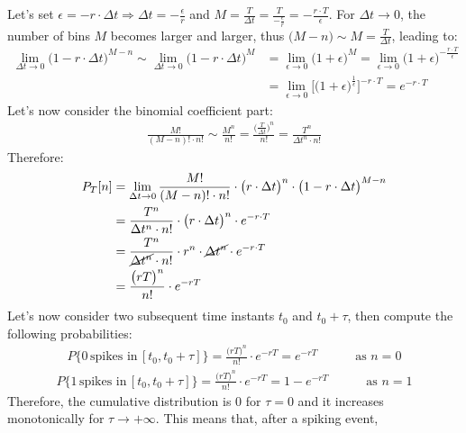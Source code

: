 Let's set \(\epsilon=-r\cdot{\Delta{t}}\Rightarrow \Delta{t}=-\frac{\epsilon}{r}\)
and \(M=\frac{T}{\Delta{t}}=\frac{T}{-\frac{\epsilon}{r}}=-\frac{r\cdot{T}}{\epsilon}\).
For \(\Delta{t}\to{0}\), the number of bins \(M\) becomes larger and larger,
thus \(\bigl(M-n\bigr)\sim{M}=\frac{T}{\Delta{t}}\), leading to:
\begin{align*}
    \lim_{\Delta{t}\to{0}}\bigl(1-r\cdot{\Delta{t}}\bigr)^{M-n}
    \sim\lim_{\Delta{t}\to{0}}\bigl(1-r\cdot{\Delta{t}}\bigr)^M
     & =\lim_{\epsilon\to{0}}\bigl(1+\epsilon\bigr)^M
    =\lim_{\epsilon\to{0}}\bigl(1+\epsilon\bigr)^{-\frac{r\cdot{T}}{\epsilon}}                      \\
     & =\lim_{\epsilon\to{0}}\biggl[\bigl(1+\epsilon\bigr)^{\frac{1}{\epsilon}}\biggr]^{-r\cdot{T}}
    =e^{-r\cdot{T}}
\end{align*}
Let's now consider the binomial coefficient part:
\begin{align*}
    \frac{M!}{(M-n)!\cdot{n!}}
    \sim\frac{M^n}{n!}
    =\frac{\bigl(\frac{T}{\Delta{t}}\bigr)^n}{n!}
    =\frac{T^n}{\Delta{t}^n\cdot{n!}}
\end{align*}
Therefore:
\begin{align*}
    P_T[n]
     & =\lim_{\Delta{t}\to{0}}\frac{M!}{(M-n)!\cdot{n!}}\cdot{\bigl(r\cdot{\Delta{t}}\bigr)^n}\cdot{\bigl(1-r\cdot{\Delta{t}}\bigr)^{M-n}} \\
     & =\frac{T^n}{\Delta{t}^n\cdot{n!}}\cdot{\bigl(r\cdot{\Delta{t}}\bigr)^n}\cdot{e^{-r\cdot{T}}}                                        \\
     & =\frac{T^n}{\cancel{\Delta{t}^n}\cdot{n!}}\cdot{r^n\cdot{\cancel{\Delta{t}^n}}}\cdot{e^{-r\cdot{T}}}                                \\
     & =\frac{\bigl(rT\bigr)^n}{n!}\cdot{e^{-rT}}
\end{align*}
Let's now consider two subsequent time instants \(t_0\) and \(t_0+\tau\), then compute
the following probabilities:
\begin{align*}
    P\{0\,\text{spikes in}\,[t_0,t_0+\tau]\}
    = \frac{\bigl(rT\bigr)^n}{n!}\cdot{e^{-rT}}
    = e^{-rT}
    \quad\quad\quad\text{as \(n=0\)}
\end{align*}
\begin{align*}
    P\{1\,\text{spikes in}\,[t_0,t_0+\tau]\}
    = \frac{\bigl(rT\bigr)^n}{n!}\cdot{e^{-rT}}
    = 1-e^{-rT}
    \quad\quad\quad\text{as \(n=1\)}
\end{align*}
Therefore, the cumulative distribution is 0 for \(\tau=0\) and it increases
monotonically for \(\tau\to{+\infty}\). This means that, after a spiking event,
